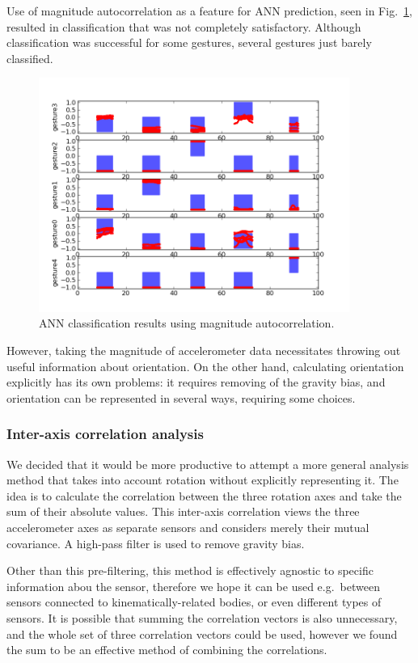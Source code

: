 \documentclass{article}
\begin{document}
Use of magnitude autocorrelation as a feature for ANN prediction, seen
in Fig.~\ref{fig:autocor_ann}, resulted in classification that was not
completely satisfactory.
Although classification was successful for some gestures, several
gestures just barely classified.

\begin{figure}
\centerline{
  \includegraphics[width=4in]{autocor_ann.png}}
\caption{ANN classification results using magnitude autocorrelation.}
\label{fig:autocor_ann}
\end{figure}

However, taking the magnitude of accelerometer data necessitates
throwing out useful information about orientation.
On the other hand, calculating orientation explicitly has its own
problems: it requires removing of the gravity bias, and orientation
can be represented in several ways, requiring some choices.

\subsubsection{Inter-axis correlation analysis}

We decided that it would be more productive to attempt a more general
analysis method that takes into account rotation without explicitly
representing it.
The idea is to calculate the correlation between the three rotation
axes and take the sum of their absolute values.
This inter-axis correlation views the three accelerometer axes as
separate sensors and considers merely their mutual covariance.
A high-pass filter is used to remove gravity bias.

Other than this pre-filtering, this method is effectively agnostic to
specific information abou the sensor, therefore we hope it can be used
e.g.\ between sensors connected to kinematically-related bodies, or
even different types of sensors.
It is possible that summing the correlation vectors is also
unnecessary, and the whole set of three correlation vectors could be
used, however we found the sum to be an effective method of combining
the correlations.
\end{document}
